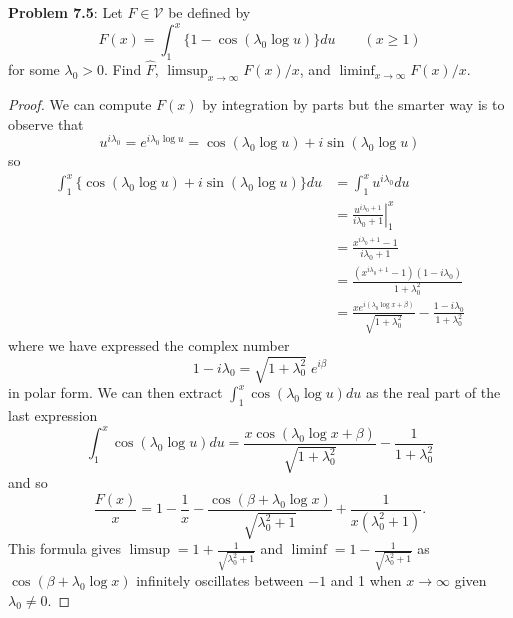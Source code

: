 \documentclass[12pt]{article}
\newcommand{\V}{\mathcal{V}}
\newcommand{\Fhat}{\widehat{F}}
\begin{document}
\fi

\textbf{Problem 7.5}: Let $F \in \V$ be defined by
$$F(x) = \int_1^x \{1 - \cos(\lambda_0 \log u)\} du \qquad (x \geq 1)$$
for some $\lambda_0 > 0$. Find $\Fhat$, $\limsup_{x \rightarrow \infty} F(x) / x$, and $\liminf_{x \rightarrow \infty} F(x) / x$.

\begin{proof}
We can compute $F(x)$ by integration by parts but the smarter way is to observe that
$$u^{i \lambda_0} = e^{i \lambda_0 \log u} = \cos(\lambda_0 \log u) + i \sin(\lambda_0 \log u)$$
so
\begin{align*}
\int_1^x \{\cos(\lambda_0 \log u) + i \sin(\lambda_0 \log u)\} du &= \int_1^x u^{i\lambda_0} du\\
&= \left. \frac{u^{i \lambda_0 + 1}}{i \lambda_0 + 1} \right|_1^x\\
&= \frac{x^{i \lambda_0 + 1} - 1}{i \lambda_0 + 1}\\
&= \frac{(x^{i \lambda_0 + 1} - 1) (1 - i \lambda_0)}{1 + \lambda_0^2}\\
&= \frac{x e^{i (\lambda_0 \log x + \beta)} }{\sqrt{ 1 + \lambda_0^2 } } - \frac{1 - i \lambda_0}{1 + \lambda_0^2}
\end{align*}
where we have expressed the complex number
$$1 - i \lambda_0 = \sqrt{1 + \lambda_0^2} \; e^{i \beta}$$
in polar form. We can then extract $\int_1^x \cos(\lambda_0 \log u) du$ as the real part of the last expression
$$\int_1^x \cos(\lambda_0 \log u) du = \frac{x \cos (\lambda_0 \log x + \beta) }{\sqrt{ 1 + \lambda_0^2 } } - \frac{1}{1 + \lambda_0^2}$$
and so
$$\frac{F(x)}{x} = 1 - \frac{1}{x} - \frac{\cos(\beta + \lambda_0 \log x)}{\sqrt{\lambda_0^2 + 1}}  + \frac{1}{x(\lambda_0^2 + 1)}.$$
This formula gives $\limsup = 1 + \frac{1}{\sqrt{\lambda_0^2 + 1}}$ and $\liminf = 1 - \frac{1}{\sqrt{\lambda_0^2 + 1}}$ as $\cos(\beta + \lambda_0 \log x)$ infinitely oscillates between $-1$ and 1 when $x \rightarrow \infty$ given $\lambda_0 \not= 0$.


\end{proof}
\end{document}
